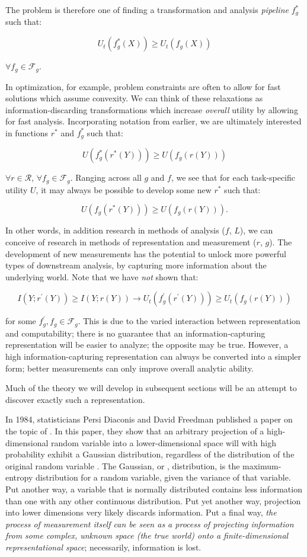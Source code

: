 \documentclass[12pt]{book}
\begin{document}
The problem is therefore one of finding a transformation and analysis \textit{pipeline} $f_g^*$ such that:

\[
U_t(f_g^*(X)) \geq U_t(f_g(X))
\]

$\forall f_g \in \mathcal{F}_g$.

In optimization, for example, problem constraints are often  to allow for fast solutions which assume convexity.
We can think of these relaxations as information-discarding transformations which increase \textit{overall} utility by allowing for fast analysis.
Incorporating notation from earlier, we are ultimately interested in functions $r^*$ and $f_g^*$ such that:

\[
U(f_g^*(r^*(Y))) \geq U(f_g(r(Y)))
\]

$\forall r \in \mathcal{R}$,  $\forall f_g \in \mathcal{F}_g$. Ranging across all $g$ and $f$, we see that for each task-specific utility $U$, it may always be possible to develop some new $r^*$ such that:

\[
U(f_g(r^*(Y))) \geq U(f_g(r(Y))).
\]

In other words, in addition research in methods of analysis ($f$, $L$), we can conceive of research in methods of representation and measurement ($r$, $g$).
The development of new measurements has the potential to unlock more powerful types of downstream analysis, by capturing more information about the underlying world.
Note that we have \textit{not} shown that:

\[
I(Y; r^\prime(Y)) \geq I(Y; r(Y)) \rightarrow U_t(f_g^\prime(r^\prime(Y))) \geq U_t(f_g(r(Y)))
\]

for some $f_g^\prime, f_g \in \mathcal{F}_g$.
This is due to the varied interaction between representation and computability; there is no guarantee that an information-capturing representation will be easier to analyze; the opposite may be true.
However, a high information-capturing representation can always be converted into a simpler form; better measurements can only improve overall analytic ability.

Much of the theory we will develop in subsequent sections will be an attempt to discover exactly such a representation.

\bigskip

In 1984, statisticians Persi Diaconis and David Freedman published a paper on the topic of .
In this paper, they show that an arbitrary projection of a high-dimensional random variable into a lower-dimensional space will with high probability exhibit a Gaussian distribution, regardless of the distribution of the original random variable \cite{diaconis}.
The Gaussian, or , distribution, is the maximum-entropy distribution for a random variable, given the variance of that variable.
Put another way, a variable that is normally distributed contains less information than one with any other continuous distribution.
Put yet another way, projection into lower dimensions very likely discards information.
Put a final way, \textit{the process of measurement itself can be seen as a process of projecting information from  some complex, unknown space (the true world) onto a finite-dimensional representational space}; necessarily, information is lost.
\end{document}
